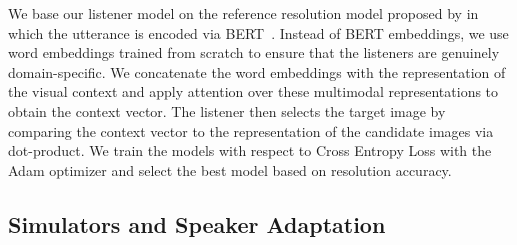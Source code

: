We base our listener model on the reference resolution model proposed by \citet{takmaz-etal-2020-refer} in which the utterance is encoded via BERT~\citep{devlin-etal-2019-bert}. Instead of BERT embeddings, we use word embeddings trained from scratch to ensure that the listeners are genuinely domain-specific. %
We concatenate the word embeddings with the representation of the visual context and apply attention over these multimodal representations to obtain the context vector. %
The listener then selects the target image by comparing the context vector to the representation of the candidate images via dot-product. We train the models with respect to Cross Entropy Loss with the Adam optimizer and select the best model based on resolution accuracy. 

\subsection{Simulators and Speaker Adaptation}
\label{sec:adapts}

